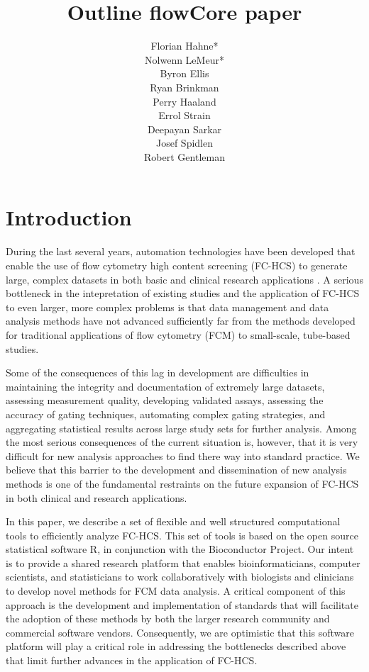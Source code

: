 \documentclass[12pt]{article}
\title{Outline flowCore paper}
\author{Florian Hahne*\\
  Nolwenn LeMeur*\\
  Byron Ellis\\
  Ryan Brinkman\\
  Perry Haaland\\
  Errol Strain\\
  Deepayan Sarkar\\
  Josef Spidlen\\
  Robert Gentleman
 }
\begin{document}
\maketitle

\section*{Introduction}
During the last several years, automation technologies have been developed
that enable the use of flow cytometry high content screening (FC-HCS)
to generate large, complex datasets in both basic and clinical research
applications \citep{references from Ryan's FC-HCS paper}. A
serious bottleneck in the intepretation of existing studies and the application of
FC-HCS to even larger, more complex problems is that data management
and data analysis methods have not advanced sufficiently far from the
methods developed for 
traditional applications of flow cytometry (FCM) to small-scale, tube-based
studies. 

Some of the consequences of this lag in development are difficulties in 
maintaining the integrity and documentation of extremely large datasets,
assessing measurement quality, developing validated assays, assessing the
accuracy of gating techniques, automating complex gating strategies, and
aggregating statistical results across large study sets for further analysis.
Among the most serious consequences of the current situation is, however, 
that it is very difficult for new analysis
approaches to find there way into standard practice. We believe that
this barrier to the development and dissemination of new analysis methods
is one of the fundamental restraints on the
future expansion of FC-HCS in both clinical and research applications.

In this paper, we describe a set of flexible and well
structured computational tools to efficiently analyze
FC-HCS. This set of tools is based on the open source statistical
software R, in conjunction with the Bioconductor Project. Our intent
is to provide a shared research platform that enables
bioinformaticians, computer scientists, and statisticians to work
collaboratively with biologists and clinicians to develop novel methods \citep{lizard2007fca} for FCM
data analysis. A critical component of this approach is the development and implementation
of standards that will facilitate the adoption of these methods
by both the larger research community and commercial software vendors.
Consequently, we are optimistic that this software platform will play a
critical role in addressing the bottlenecks described above that limit
further advances in the application of FC-HCS.
\end{document}
